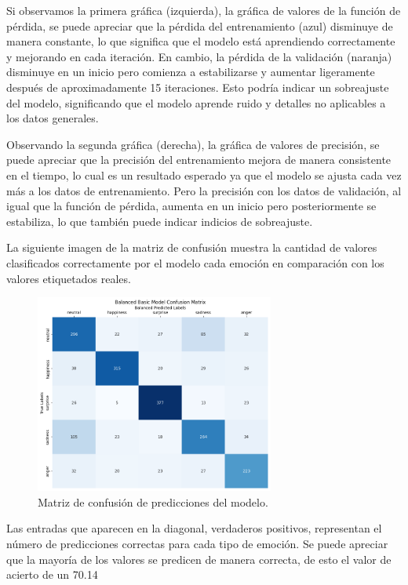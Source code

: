 \documentclass[12pt]{report} %
\begin{document}
Si observamos la primera gráfica (izquierda), la gráfica de valores de la función de pérdida, se puede apreciar que la pérdida del entrenamiento (azul) disminuye de manera constante, lo que significa que el modelo está aprendiendo correctamente y mejorando en cada iteración. En cambio, la pérdida de la validación (naranja) disminuye en un inicio pero comienza a estabilizarse y aumentar ligeramente después de aproximadamente 15 iteraciones. Esto podría indicar un sobreajuste del modelo, significando que el modelo aprende ruido y detalles no aplicables a los datos generales.

Observando la segunda gráfica (derecha), la gráfica de valores de precisión, se puede apreciar que la precisión del entrenamiento mejora de manera consistente en el tiempo, lo cual es un resultado esperado ya que el modelo se ajusta cada vez más a los datos de entrenamiento. Pero la precisión con los datos de validación, al igual que la función de pérdida, aumenta en un inicio pero posteriormente se estabiliza, lo que también puede indicar indicios de sobreajuste.

La siguiente imagen de la matriz de confusión muestra la cantidad de valores clasificados correctamente por el modelo cada emoción en comparación con los valores etiquetados reales.

\begin{figure}[H]
	\centering
	\includegraphics[width=0.7\textwidth]{matrizConfusion.png}
	\caption{Matriz de confusión de predicciones del modelo.}
	\label{fig:imagen32}
\end{figure}

Las entradas que aparecen en la diagonal, verdaderos positivos, representan el número de predicciones correctas para cada tipo de emoción. Se puede apreciar que la mayoría de los valores se predicen de manera correcta, de esto el valor de acierto de un 70.14%
\end{document}
